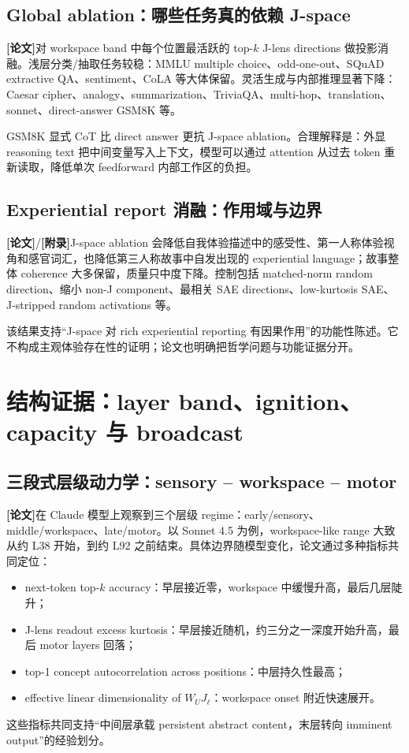 \documentclass[10.5pt,a4paper]{ctexart}
\newcommand{\Paper}{\textbf{[论文]}}
\newcommand{\AppendixTag}{\textbf{[附录]}}
\begin{document}
\subsection{Global ablation：哪些任务真的依赖 J-space}
\Paper 对 workspace band 中每个位置最活跃的 top-$k$ J-lens directions 做投影消融。浅层分类/抽取任务较稳：MMLU multiple choice、odd-one-out、SQuAD extractive QA、sentiment、CoLA 等大体保留。灵活生成与内部推理显著下降：Caesar cipher、analogy、summarization、TriviaQA、multi-hop、translation、sonnet、direct-answer GSM8K 等。

GSM8K 显式 CoT 比 direct answer 更抗 J-space ablation。合理解释是：外显 reasoning text 把中间变量写入上下文，模型可以通过 attention 从过去 token 重新读取，降低单次 feedforward 内部工作区的负担。

\subsection{Experiential report 消融：作用域与边界}
\Paper/\AppendixTag J-space ablation 会降低自我体验描述中的感受性、第一人称体验视角和感官词汇，也降低第三人称故事中自发出现的 experiential language；故事整体 coherence 大多保留，质量只中度下降。控制包括 matched-norm random direction、缩小 non-J component、最相关 SAE directions、low-kurtosis SAE、J-stripped random activations 等。

该结果支持“J-space 对 rich experiential reporting 有因果作用”的功能性陈述。它不构成主观体验存在性的证明；论文也明确把哲学问题与功能证据分开。

\section{结构证据：layer band、ignition、capacity 与 broadcast}

\subsection{三段式层级动力学：sensory -- workspace -- motor}
\Paper 在 Claude 模型上观察到三个层级 regime：early/sensory、middle/workspace、late/motor。以 Sonnet 4.5 为例，workspace-like range 大致从约 L38 开始，到约 L92 之前结束。具体边界随模型变化，论文通过多种指标共同定位：
\begin{itemize}
\item next-token top-$k$ accuracy：早层接近零，workspace 中缓慢升高，最后几层陡升；
\item J-lens readout excess kurtosis：早层接近随机，约三分之一深度开始升高，最后 motor layers 回落；
\item top-1 concept autocorrelation across positions：中层持久性最高；
\item effective linear dimensionality of $W_UJ_\ell$：workspace onset 附近快速展开。
\end{itemize}
这些指标共同支持“中间层承载 persistent abstract content，末层转向 imminent output”的经验划分。
\end{document}
